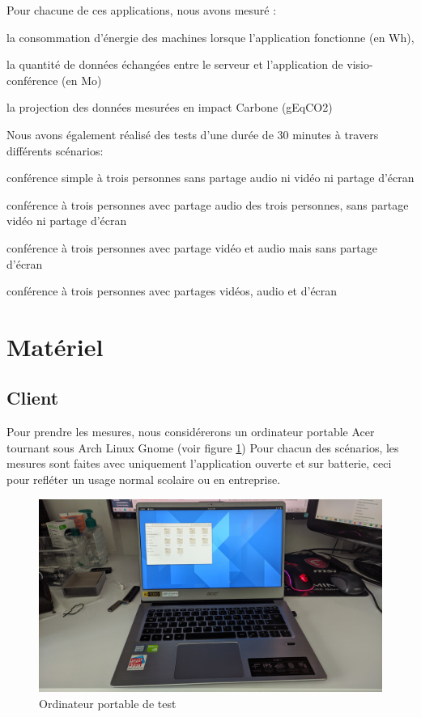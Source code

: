 \documentclass[11pt,a4paper]{report}
\begin{document}
\noindent Pour chacune de ces applications, nous avons mesuré :
\bi \item la consommation d'énergie des machines lorsque l'application fonctionne (en Wh),
\item la quantité de données échangées entre le serveur et l'application de visio-conférence (en Mo)
\item la projection des données mesurées en impact Carbone (gEqCO2)
\ei

\noindent Nous avons également réalisé des tests d'une durée de 30 minutes à travers différents scénarios:
\bi \item conférence simple à trois personnes sans partage audio ni vidéo ni partage d'écran 
\item conférence à trois personnes avec partage audio des trois personnes, sans partage vidéo ni partage d'écran
\item conférence à trois personnes avec partage vidéo et audio mais sans partage d'écran
\item conférence à trois personnes avec partages vidéos, audio et d'écran \ei 

\section{Matériel}
\subsection{Client}
Pour prendre les mesures, nous considérerons un ordinateur portable Acer tournant sous Arch Linux Gnome (voir figure \ref{fig:test}) Pour chacun des scénarios, les mesures sont faites avec uniquement l'application ouverte et sur batterie, ceci pour refléter un usage normal scolaire ou en entreprise.
\begin{figure}[!h]
    \centering
    \includegraphics[scale=0.1]{ordinateur.jpg}
    \caption{Ordinateur portable de test}
     \label{fig:test}
\end{figure}
\end{document}
